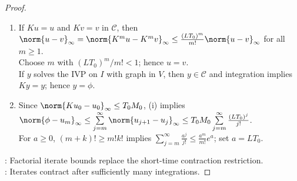 \begin{theorem}
\begin{proof}
\begin{enumerate}[label=(\roman*)]
Thus $\phi(t)=x_0+\int_{t_0}^t f(s,\phi(s))\,ds$, so $\phi\in C^1(I,\R^n)$, $\phi(t_0)=x_0$, and $\phi'=f(\,\cdot\,,\phi)$.
\item If $Ku=u$ and $Kv=v$ in $\mathcal{C}$, then $\norm{u-v}_\infty=\norm{K^mu-K^mv}_\infty\leq\frac{(LT_0)^m}{m!}\norm{u-v}_\infty$ for all $m\geq1$.\\
Choose $m$ with $(LT_0)^m/m!<1$; hence $u=v$.\\
If $y$ solves the IVP on $I$ with graph in $V$, then $y\in\mathcal{C}$ and integration implies $Ky=y$; hence $y=\phi$.
\item Since $\norm{Ku_0-u_0}_\infty\leq T_0M_0$, (i) implies $\norm{\phi-u_m}_\infty\leq\sum\limits_{j=m}^{\infty}\norm{u_{j+1}-u_j}_\infty\leq T_0M_0\sum\limits_{j=m}^{\infty}\frac{(LT_0)^j}{j!}$.\\
For $a\geq0$, $(m+k)!\geq m!k!$ implies $\sum\limits_{j=m}^{\infty}\frac{a^j}{j!}\leq\frac{a^m}{m!}e^a$; set $a=LT_0$.
\end{enumerate}
: Factorial iterate bounds replace the short-time contraction restriction.\\
: Iterates contract after sufficiently many integrations.
\end{proof}
\end{theorem}

